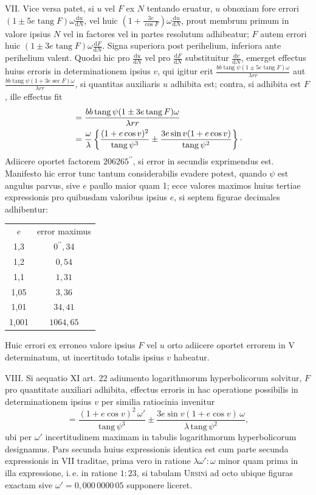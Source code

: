 VII. Vice versa patet, si $u$ vel $F$ ex $N$ tentando eruatur, $u$ obnoxiam fore errori $(1\pm5e\operatorname{tang}F)\omega\frac{\mathrm{d}u}{\mathrm{d}N}$, vel huic $\left(1+\frac{3e}{\cos F}\right)\omega\frac{\mathrm{d}u}{\mathrm{d}N}$, prout membrum primum in valore ipsius $N$ vel in factores vel in partes resolutum adhibeatur; $F$ autem errori huic $(1\pm3e\operatorname{tang}F)\omega\frac{\mathrm{d}F}{\mathrm{d}N}$. Signa superiora post perihelium, inferiora ante perihelium valent. Quodsi hic pro $\frac{\mathrm{d}u}{\mathrm{d}N}$ vel pro $\frac{\mathrm{d}F}{\mathrm{d}N}$ substituitur $\frac{\mathrm{d}v}{\mathrm{d}N}$, emerget effectus huius erroris in determinationem ipsius $v$, qui igitur erit $\frac{bb\operatorname{tang}\psi(1\pm5e\operatorname{tang}F)\omega}{\lambda rr}$ aut $\frac{bb\operatorname{tang}\psi(1+3e\operatorname{sec} F)\omega}{\lambda rr}$, si quantitas auxiliaris $u$ adhibita est; contra, si adhibita est $F$, ille effectus fit
\[
\begin{aligned}
&=\frac{bb\operatorname{tang}\psi(1\pm3e\operatorname{tang}F)\omega}{\lambda rr}\\
&=\frac{\omega}{\lambda}\left\{\frac{(1+e\cos v)^2}{\operatorname{tang}\psi^3}\pm\frac{3e\sin v(1+e\cos v)}{\operatorname{tang}\psi^2}\right\}\raisebox{.45ex}{.}
\end{aligned}
\]
Adiicere oportet factorem $206265^{\prime\prime}$, si error in secundis exprimendus est. Manifesto hic error tunc tantum considerabilis evadere potest, quando $\psi$ est angulus parvus, sive $e$ paullo maior quam 1; ecce valores maximos huius tertiae expressionis pro quibusdam valoribus ipsius $e$, si septem figurae decimales adhibentur:

\begin{center}
\begin{tabular}{c|c}
$e$ & error maximus \\
1,3 & $0^{\prime\prime}{,}34$ \\
1,2 & $0{,}54$ \\
1,1 & $1{,}31$ \\
1,05 & $3{,}36$ \\
1,01 & $34{,}41$ \\
1,001 & $1064{,}65$ \\
\end{tabular}
\end{center}
\noindent Huic errori ex erroneo valore ipsius $F$ vel $u$ orto adiicere oportet errorem in V determinatum, ut incertitudo totalis ipsius $v$ habeatur.

VIII. Si aequatio XI art. 22 adiumento logarithmorum hyperbolicorum solvitur, $F$ pro quantitate auxiliari adhibita, effectus erroris in hac operatione possibilis in determinationem ipsius $v$ per similia ratiocinia invenitur
\[
= \frac{(1+e\cos v)^2\,\omega'}{\mathrm{tang}\,\psi^3} \pm \frac{3e\sin v(1+e\cos v)\,\omega}{\lambda\,\mathrm{tang}\,\psi^2},
\]
ubi per $\omega'$ incertitudinem maximam in tabulis logarithmorum hyperbolicorum designamus. Pars secunda huius expressionis identica est cum parte secunda expressionis in VII traditae, prima vero in ratione $\lambda\omega' : \omega$ minor quam prima in illa expressione, i.\,e. in ratione $1:23$, si tabulam \textsc{Ursin}i ad octo ubique figuras exactam sive $\omega' = 0{,}000\,0000\,05$ supponere liceret.
